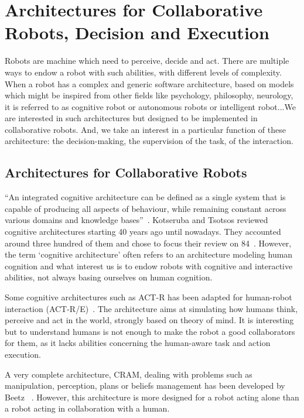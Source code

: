 \documentclass[a4paper,11pt,twoside]{StyleThese}
\begin{document}
\section{Architectures for Collaborative Robots, Decision and Execution}\label{chap1:sec:archi}

Robots are machine which need to perceive, decide and act. There are multiple ways to endow a robot with such abilities, with different levels of complexity. When a robot has a complex and generic software architecture, based on models which might be inspired from other fields like psychology, philosophy, neurology, it is referred to as cognitive robot or autonomous robots or intelligent robot...We are interested in such architectures but designed to be implemented in collaborative robots. And, we take an interest in a particular function of these architecture: the decision-making, the supervision of the task, of the interaction.

\subsection{Architectures for Collaborative Robots}\label{chap1:subsec:archi}
``An integrated cognitive architecture can be defined as a single system that is capable of producing all aspects of behaviour, while remaining constant across various domains and knowledge bases''~\cite[p.~104]{chong_2007_integrated}. Kotseruba and Tsotsos reviewed cognitive architectures starting 40 years ago until nowadays. They accounted around three hundred of them and chose to focus their review on 84~\cite{kotseruba_2020_40}. However, the term \textquoteleft cognitive architecture\textquoteright{} often refers to an architecture modeling human cognition and what interest us is to endow robots with cognitive and interactive abilities, not always basing ourselves on human cognition.  

Some cognitive architectures such as ACT-R has been adapted for human-robot interaction (ACT-R/E)~\cite{trafton_2013_act}. The architecture aims at simulating how humans think, perceive and act in the world, strongly based on theory of mind. It is interesting but to understand humans is not enough to make the robot a good collaborators for them, as it lacks abilities concerning the human-aware task and action execution. 

A very complete architecture, CRAM, dealing with problems such as manipulation, perception, plans or beliefs management has been developed by Beetz \etal~\cite{beetz_2010_cram}. However, this architecture is more designed for a robot acting alone than a robot acting in collaboration with a human.
\end{document}
